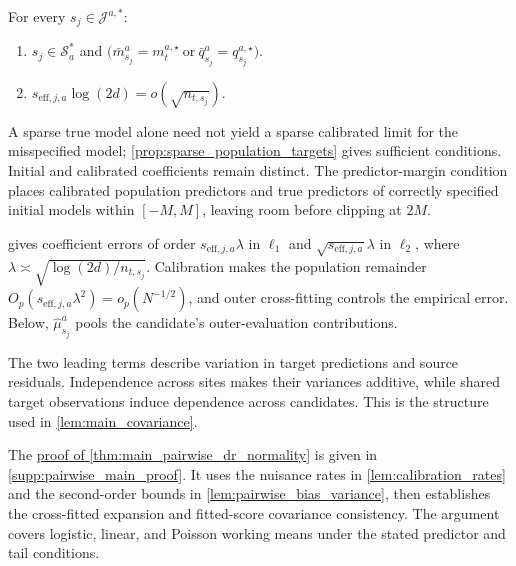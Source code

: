 \documentclass[12pt]{article}
\begin{document}
\begin{assumption}\label{asmp:main_nuisance}
For every $s_j\in\mathcal J^{a,*}$:
\begin{enumerate}[label=(\alph*),leftmargin=*]
\item $s_j\in\mathcal S_a^*$ and $\bigl(\bar m_{s_j}^a=m_t^{a,\star}\ \text{or}\ \bar q_{s_j}^a=q_{s_j}^{a,\star}\bigr)$.
\item $s_{\mathrm{eff},j,a}\log(2d)=o(\sqrt{n_{t,s_j}})$.
\end{enumerate}
\end{assumption}

A sparse true model alone need not yield a sparse calibrated limit for the misspecified model; \cref{prop:sparse_population_targets} gives sufficient conditions. Initial and calibrated coefficients remain distinct. The predictor-margin condition places calibrated population predictors and true predictors of correctly specified initial models within $[-M,M]$, leaving room before clipping at $2M$.

 gives coefficient errors of order $s_{\mathrm{eff},j,a}\lambda$ in $\ell_1$ and $\sqrt{s_{\mathrm{eff},j,a}}\lambda$ in $\ell_2$, where $\lambda\asymp\sqrt{\log(2d)/n_{t,s_j}}$. Calibration makes the population remainder $O_p(s_{\mathrm{eff},j,a}\lambda^2)=o_p(N^{-1/2})$, and outer cross-fitting controls the empirical error. Below, $\widehat\mu_{s_j}^a$ pools the candidate's outer-evaluation contributions.

\begin{lemma}\label{thm:main_pairwise_dr_normality}
\FACEHDSourceExpansion
\end{lemma}

The two leading terms describe variation in target predictions and source residuals. Independence across sites makes their variances additive, while shared target observations induce dependence across candidates. This is the structure used in \cref{lem:main_covariance}.

The \hyperref[proof:main_source_expansion]{proof of \cref*{thm:main_pairwise_dr_normality}} is given in \cref{supp:pairwise_main_proof}. It uses the nuisance rates in \cref{lem:calibration_rates} and the second-order bounds in \cref{lem:pairwise_bias_variance}, then establishes the cross-fitted expansion and fitted-score covariance consistency. The argument covers logistic, linear, and Poisson working means under the stated predictor and tail conditions.
\end{document}
